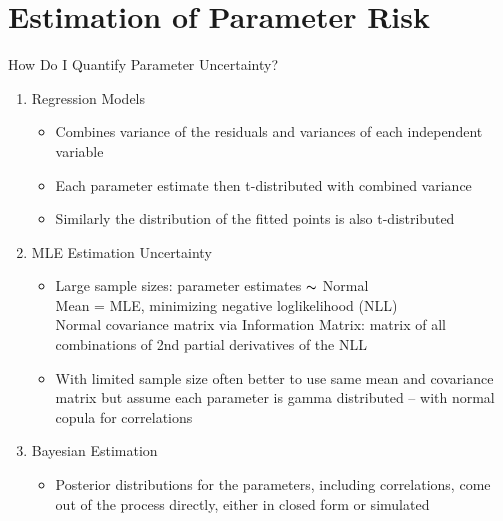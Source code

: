 \documentclass[10pt, xcolor=x11names,compress]{beamer}
\begin{document}
\section{Estimation of Parameter Risk}
\begin{frame}{How Do I Quantify Parameter Uncertainty?}
	\begin{enumerate}
		\item<1-> Regression Models
		\begin{itemize}
			\item<1-> Combines variance of the residuals and variances of each independent variable
			\item<1-> Each parameter estimate then t-distributed with combined variance
			\item<1-> Similarly the distribution of the fitted points is also t-distributed
		\end{itemize}
		
		\item<2-> MLE Estimation Uncertainty
		\begin{itemize}
			\item<2-> Large sample sizes: parameter estimates $\thicksim$ Normal\\
				Mean = MLE, minimizing negative loglikelihood (NLL)\\
				Normal covariance matrix via Information Matrix: matrix of all combinations of 2nd partial derivatives of the NLL	
			\item<2-> With limited sample size often better to use same mean and covariance matrix but assume each parameter is gamma distributed -- with normal copula for correlations
		\end{itemize}	
		
			\item<3-> Bayesian Estimation
					\begin{itemize}
			\item<3-> Posterior distributions for the parameters, including correlations, come out of the process directly, either in closed form or simulated
		\end{itemize}	


	\end{enumerate}
\end{frame}

\end{document}
